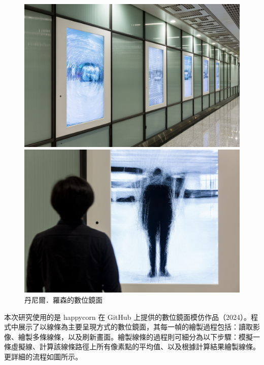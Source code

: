 \documentclass[12pt]{article}
\begin{document}
\begin{figure}[htbp]
  \centering
  \begin{minipage}[b]{0.45\textwidth}
    \centering
    \includegraphics[width=\textwidth]{img/mirror_example_2.jpg}
  \end{minipage}
  \hfill
  \begin{minipage}[b]{0.45\textwidth}
    \centering
    \includegraphics[width=\textwidth]{img/mirror_example_3.jpg}
  \end{minipage}
\caption{丹尼爾．羅森的數位鏡面}\label{fig:mirror_example_23}
\end{figure}

本次研究使用的是 happycorn 在 GitHub 上提供的數位鏡面模仿作品（2024）。程式中展示了以線條為主要呈現方式的數位鏡面，其每一幀的繪製過程包括：讀取影像、繪製多條線條，以及刷新畫面。繪製線條的過程則可細分為以下步驟：模擬一條虛擬線、計算該線條路徑上所有像素點的平均值、以及根據計算結果繪製線條。更詳細的流程如圖所示。
\end{document}
